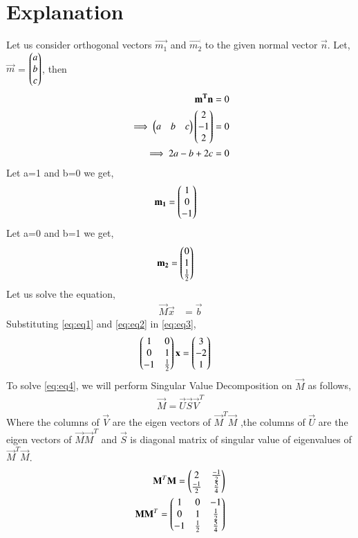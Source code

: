 \documentclass[journal,12pt,twocolumn]{IEEEtran}
\begin{document}
\section{Explanation}
Let us consider orthogonal vectors $\vec{m_1}$ and $\vec{m_2}$ to the given normal vector $\vec{n}$. Let, $\vec{m}$ = $\begin{pmatrix}a\\b\\c\end{pmatrix}$, then
\begin{align}
\mathbf{m^T}\mathbf{n} &= 0\\
\implies\begin{pmatrix}a&b&c\end{pmatrix}\begin{pmatrix}2\\-1\\2\end{pmatrix} &= 0\\
\implies2a-b+2c &= 0
\end{align}
Let a=1 and b=0 we get,
\begin{align}
\mathbf{m_1} &= \begin{pmatrix}1\\0\\-1\end{pmatrix} \label{eq:eq1}
\end{align}
Let a=0 and b=1 we get,
\begin{align}
\mathbf{m_2} &= \begin{pmatrix}0\\1\\\frac{1}{2}\end{pmatrix} \label{eq:eq2}
\end{align}
Let us solve the equation,
\begin{align}
\vec{M}\vec{x} &= \vec{b}\label{eq:eq3}
\end{align}
Substituting \eqref{eq:eq1} and \eqref{eq:eq2} in \eqref{eq:eq3},
\begin{align}
    \begin{pmatrix}1&0\\0&1\\-1&\frac{1}{2}\end{pmatrix}\mathbf{x} &= \begin{pmatrix}3\\-2\\1\end{pmatrix}\label{eq:eq4}
\end{align}
To solve \eqref{eq:eq4}, we will perform Singular Value Decomposition on $\vec{M}$ as follows,
\begin{align}
\vec{M}=\vec{U}\vec{S}\vec{V}^T\label{eq:eq5}
\end{align}
Where the columns of $\vec{V}$ are the eigen vectors of $\vec{M}^T\vec{M}$ ,the columns of $\vec{U}$ are the eigen vectors of $\vec{M}\vec{M}^T$ and $\vec{S}$ is diagonal matrix of singular value of eigenvalues of $\vec{M}^T\vec{M}$.
\begin{align}
\mathbf{M}^T\mathbf{M}=\begin{pmatrix}2&\frac{-1}{2}\\\frac{-1}{2}&\frac{5}{4}\end{pmatrix}\label{eq:eq6}\\
\mathbf{M}\mathbf{M}^T=\begin{pmatrix}1&0&-1\\0&1&\frac{1}{2}\\-1&\frac{1}{2}&\frac{5}{4}\end{pmatrix}
\end{align}
\end{document}
